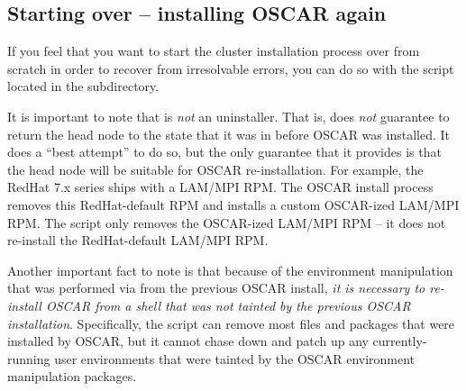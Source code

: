 

\subsection{Starting over -- installing OSCAR again}

If you feel that you want to start the cluster installation process
over from scratch in order to recover from irresolvable errors, you
can do so with the  script located in the
 subdirectory.

It is important to note that  is {\em not} an
uninstaller.  That is,  does {\em not} guarantee to
return the head node to the state that it was in before OSCAR was
installed.  It does a ``best attempt'' to do so, but the only
guarantee that it provides is that the head node will be suitable for
OSCAR re-installation.  For example, the RedHat 7.x series ships with
a LAM/MPI RPM.  The OSCAR install process removes this RedHat-default
RPM and installs a custom OSCAR-ized LAM/MPI RPM.  The
 script only removes the OSCAR-ized LAM/MPI RPM -- it
does not re-install the RedHat-default LAM/MPI RPM.

Another important fact to note is that because of the environment
manipulation that was performed via  from the previous
OSCAR install, {\em it is necessary to re-install OSCAR from a shell
  that was not tainted by the previous OSCAR installation}.
Specifically, the  script can remove most files and
packages that were installed by OSCAR, but it cannot chase down and
patch up any currently-running user environments that were tainted by
the OSCAR environment manipulation packages.

